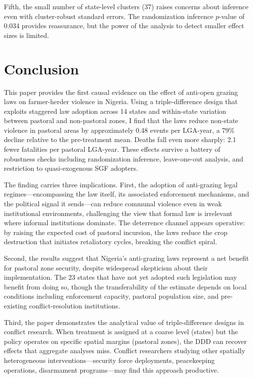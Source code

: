 \documentclass[12pt]{article}
\begin{document}
Fifth, the small number of state-level clusters (37) raises concerns about inference even with cluster-robust standard errors. The randomization inference $p$-value of 0.034 provides reassurance, but the power of the analysis to detect smaller effect sizes is limited.


\section{Conclusion}

This paper provides the first causal evidence on the effect of anti-open grazing laws on farmer-herder violence in Nigeria. Using a triple-difference design that exploits staggered law adoption across 14 states and within-state variation between pastoral and non-pastoral zones, I find that the laws reduce non-state violence in pastoral areas by approximately 0.48 events per LGA-year, a 79\% decline relative to the pre-treatment mean. Deaths fall even more sharply: 2.1 fewer fatalities per pastoral LGA-year. These effects survive a battery of robustness checks including randomization inference, leave-one-out analysis, and restriction to quasi-exogenous SGF adopters.

The finding carries three implications. First, the adoption of anti-grazing legal regimes---encompassing the law itself, its associated enforcement mechanisms, and the political signal it sends---can reduce communal violence even in weak institutional environments, challenging the view that formal law is irrelevant where informal institutions dominate. The deterrence channel appears operative: by raising the expected cost of pastoral incursion, the laws reduce the crop destruction that initiates retaliatory cycles, breaking the conflict spiral.

Second, the results suggest that Nigeria's anti-grazing laws represent a net benefit for pastoral zone security, despite widespread skepticism about their implementation. The 23 states that have not yet adopted such legislation may benefit from doing so, though the transferability of the estimate depends on local conditions including enforcement capacity, pastoral population size, and pre-existing conflict-resolution institutions.

Third, the paper demonstrates the analytical value of triple-difference designs in conflict research. When treatment is assigned at a coarse level (states) but the policy operates on specific spatial margins (pastoral zones), the DDD can recover effects that aggregate analyses miss. Conflict researchers studying other spatially heterogeneous interventions---security force deployments, peacekeeping operations, disarmament programs---may find this approach productive.
\end{document}
